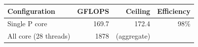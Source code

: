 \begin{tabular}{lrrr}
\hline
Configuration & GFLOPS & Ceiling & Efficiency \\
\hline
Single P core & 169.7 & 172.4 & 98\% \\
All core (28 threads) & 1878 & (aggregate) & \\
\hline
\end{tabular}
